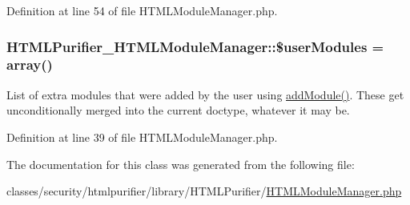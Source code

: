 Definition at line 54 of file H\+T\+M\+L\+Module\+Manager.\+php.

\hypertarget{classHTMLPurifier__HTMLModuleManager_acb5e35e4049e59fda2f13e974211f420}{
\subsubsection[{\$user\+Modules}]{\setlength{\rightskip}{0pt plus 5cm}H\+T\+M\+L\+Purifier\+\_\+\+H\+T\+M\+L\+Module\+Manager\+::\$user\+Modules = array()}}\label{classHTMLPurifier__HTMLModuleManager_acb5e35e4049e59fda2f13e974211f420}
List of extra modules that were added by the user using \hyperlink{classHTMLPurifier__HTMLModuleManager_a4431aef113f408e637230870a06f1d6a}{add\+Module()}. These get unconditionally merged into the current doctype, whatever it may be. 

Definition at line 39 of file H\+T\+M\+L\+Module\+Manager.\+php.



The documentation for this class was generated from the following file\+:\begin{DoxyCompactItemize}
\item 
classes/security/htmlpurifier/library/\+H\+T\+M\+L\+Purifier/\hyperlink{HTMLModuleManager_8php}{H\+T\+M\+L\+Module\+Manager.\+php}\end{DoxyCompactItemize}
